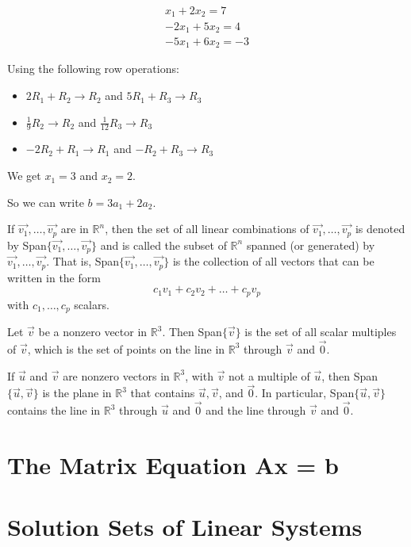 \documentclass[../linalg.tex]{subfiles}
\begin{document}
\begin{example}
    \begin{align*}
        x_1+2x_2=7\\
        -2x_1+5x_2=4\\
        -5x_1+6x_2=-3
    \end{align*}

    Using the following row operations:
    \begin{itemize}
        \item $2R_1+R_2 \rightarrow R_2$ and $5R_1+R_3\rightarrow R_3$
        \item $\frac{1}{9}R_2 \rightarrow R_2$ and $\frac{1}{12}R_3\rightarrow R_3$
        \item $-2R_2 + R_1 \rightarrow R_1$ and $-R_2+R_3 \rightarrow R_3$
    \end{itemize}

    We get $x_1=3$ and $x_2=2$.

    So we can write $b=3a_1+2a_2$.
\end{example}

\begin{definition}
    If $\vec{v_1},\dots,\vec{v_p}$ are in $\mathbb{R}^n$, then the set of all linear combinations of $\vec{v_1},\dots,\vec{v_p}$ is denoted by Span$\{\vec{v_1},\dots,\vec{v_p}\}$ and is called the subset of $\mathbb{R}^n$ spanned (or generated) by $\vec{v_1},\dots,\vec{v_p}$. That is, Span$\{\vec{v_1},\dots,\vec{v_p}\}$ is the collection of all vectors that can be written in the form 
    \[ c_1 v_1+c_2 v_2+\dots+c_p v_p\]
    with $c_1,\dots, c_p$ scalars.
\end{definition}

Let $\vec{v}$ be a nonzero vector in $\mathbb{R}^3$. Then Span$\{\vec{v}\}$ is the set of all scalar multiples of $\vec{v}$, which is the set of points on the line in $\mathbb{R}^3$ through $\vec{v}$ and $\vec{0}$.

If $\vec{u}$ and $\vec{v}$ are nonzero vectors in $\mathbb{R}^3$, with $\vec{v}$ not a multiple of $\vec{u}$, then Span$\{\vec{u},\vec{v}\}$ is the plane in $\mathbb{R}^3$ that contains $\vec{u},\vec{v}$, and $\vec{0}$. In particular, Span$\{\vec{u},\vec{v}\}$ contains the line in $\mathbb{R}^3$ through $\vec{u}$ and $\vec{0}$ and the line through $\vec{v}$ and $\vec{0}$.

\section{The Matrix Equation Ax = b}
\section{Solution Sets of Linear Systems}
\end{document}

